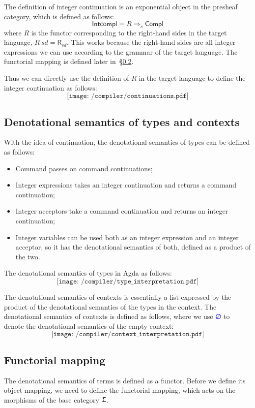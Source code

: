 \documentclass[12pt,a4paper]{report}
\theoremstyle{definition}
\newcommand{\secref}[1]{\S\ref{#1}}
\newcommand{\mb}[1]{\textcolor{mediumblue}{#1}}
\begin{document}
    The definition of integer continuation is an exponential object in the presheaf category, which is defined as follows:
    \[\mathsf{Intcompl} = R \Rightarrow_s \mathsf{Compl} \]
    where $R$ is the functor corresponding to the right-hand sides in the target language, $R\ \textit{sd} = \textsf{R}_{\textit{sd}}$. This works because the right-hand sides are all integer expressions we can use according to the grammar of the target language. The functorial mapping is defined later in~\secref{subsec: functorial_mapping}.
    
    Thus we can directly use the definition of $R$ in the target language to define the integer continuation as follows:
    \[\texttt{[image: /compiler/continuations.pdf]}\]

    \subsection{Denotational semantics of types and contexts} \label{subsec: type_interpretation}
    With the idea of continuation, the denotational semantics of types can be defined as follows:
    \begin{itemize}
        \item Command passes on command continuations;
        \item Integer expressions takes an integer continuation and returns a command continuation;
        \item Integer acceptors take a command continuation and returns an integer continuation;
        \item Integer variables can be used both as an integer expression and an integer acceptor, so it has the denotational semantics of both, defined as a product of the two.
    \end{itemize}
    
    The denotational semantics of types in Agda as follows:
    \[\texttt{[image: /compiler/type\_interpretation.pdf]}\]

    The denotational semantics of contexts is essentially a list expressed by the product of the denotational semantics of the types in the context. The denotational semantics of contexts is defined as follows, where we use \mb{∅} to denote the denotational semantics of the empty context:
    \[\texttt{[image: /compiler/context\_interpretation.pdf]}\]

    \subsection{Functorial mapping} \label{subsec: functorial_mapping}
    The denotational semantics of terms is defined as a functor. Before we define its object mapping, we need to define the functorial mapping, which acts on the morphisms of the base category $\Upsigma$. 
\end{document}
